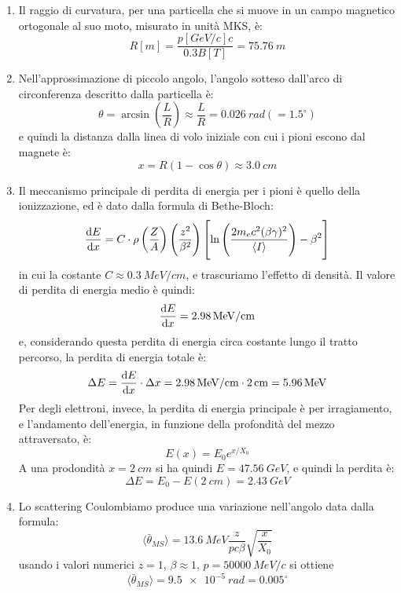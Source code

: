 \begin{Answer}
  \begin{enumerate}
  \item Il raggio di curvatura, per una particella che si muove in un campo magnetico ortogonale al suo moto, misurato in unit\`a MKS, \`e:
    \[
    R [m] = \frac{p[GeV/c] c}{0.3 B[T]} = \SI{75.76}{m}
    \]

  \item Nell'approssimazione di piccolo angolo, l'angolo sotteso
    dall'arco di circonferenza descritto dalla particella \`e:
    \[
    \theta = \arcsin\left(\frac{L}{R}\right) \approx \frac{L}{R} = \SI{0.026}{rad} (=1.5^\circ)
    \]
    e quindi la distanza dalla linea di volo iniziale con cui i pioni escono dal magnete \`e:
    \[
    x = R(1-\cos\theta) \approx \SI{3.0}{cm}
    \]

  \item Il meccanismo principale di perdita di energia per i pioni \`e quello della ionizzazione, ed \`e dato dalla
    formula di Bethe-Bloch:
    \[
    \dv{E}{x} = C \cdot \rho \left(\frac{Z}{A}\right) \left( \frac{z^2}{\beta^2} \right)
    \left[\ln\left(\frac{2m_e c^2(\beta\gamma)^2}{\langle I \rangle}\right) -\beta^2 \right]
    \]
    in cui la costante $C \approx \SI{0.3}{MeV/cm}$, e trascuriamo l'effetto di densit\`a.
    Il valore di perdita di energia medio \`e quindi:
    \[
    \dv{E}{x} = \SI{2.98}{MeV/cm}
    \]
    e, considerando questa perdita di energia circa costante lungo il tratto percorso, la perdita di energia totale \`e:
    \[
    \Delta E = \dv{E}{x} \cdot \Delta x =  \SI{2.98}{MeV/cm} \cdot \SI{2}{cm} = \SI{5.96}{MeV}
    \]
    Per degli elettroni, invece, la perdita di energia principale \`e per irragiamento, e l'andamento
    dell'energia, in funzione della profondit\`a del mezzo attraversato, \`e:
    \[
    E(x) = E_0 e^{x/X_0}
    \]
    A una prodondit\`a $x=\SI{2}{cm}$ si ha quindi $E=\SI{47.56}{GeV}$, e quindi la perdita \`e:
    \[
    \Delta E = E_0 - E(\SI{2}{cm}) = \SI{2.43}{GeV}
    \]

  \item Lo scattering Coulombiamo produce una variazione nell’angolo data dalla formula:
    \[
    \langle \bar \theta_{MS} \rangle = \SI{13.6}{MeV} \frac{z}{pc\beta}\sqrt{\frac{x}{X_0}}
    \]
    usando i valori numerici $z=1$, $\beta\approx 1$, $p=\SI{50000}{MeV/c}$ si ottiene
    \[
    \langle \bar \theta_{MS} \rangle = \SI{9.5e-5}{rad} = 0.005^\circ
    \]
   \end{enumerate}
\end{Answer}


